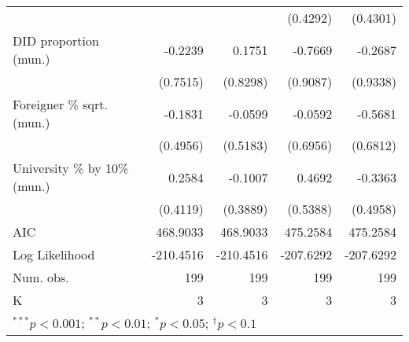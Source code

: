 \begin{tabular}{l D{.}{.}{4.5} D{.}{.}{4.5} D{.}{.}{4.5} D{.}{.}{4.5}}
                                  &           &           & (0.4292)  & (0.4301)  \\
DID proportion (mun.)             & -0.2239   & 0.1751    & -0.7669   & -0.2687   \\
                                  & (0.7515)  & (0.8298)  & (0.9087)  & (0.9338)  \\
Foreigner \% sqrt. (mun.)         & -0.1831   & -0.0599   & -0.0592   & -0.5681   \\
                                  & (0.4956)  & (0.5183)  & (0.6956)  & (0.6812)  \\
University \% by 10\% (mun.)      & 0.2584    & -0.1007   & 0.4692    & -0.3363   \\
                                  & (0.4119)  & (0.3889)  & (0.5388)  & (0.4958)  \\
\midrule
AIC                               & 468.9033  & 468.9033  & 475.2584  & 475.2584  \\
Log Likelihood                    & -210.4516 & -210.4516 & -207.6292 & -207.6292 \\
Num. obs.                         & 199       & 199       & 199       & 199       \\
K                                 & 3         & 3         & 3         & 3         \\
\bottomrule
{}
\end{tabular}

